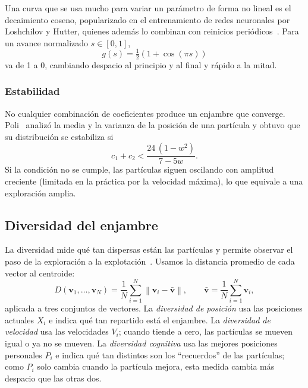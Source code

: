 Una curva que se usa mucho para variar un parámetro de forma no lineal es el decaimiento coseno, popularizado en el entrenamiento de redes neuronales por Loshchilov y Hutter, quienes además lo combinan con reinicios periódicos~\cite{loshchilov2017sgdr}. Para un avance normalizado $s \in [0,1]$,
\begin{equation}
g(s) = \tfrac{1}{2}\left(1 + \cos(\pi s)\right)
\label{eq:coseno}
\end{equation}
va de 1 a 0, cambiando despacio al principio y al final y rápido a la mitad.

\subsubsection{Estabilidad}

No cualquier combinación de coeficientes produce un enjambre que converge. Poli~\cite{poli2009mean} analizó la media y la varianza de la posición de una partícula y obtuvo que su distribución se estabiliza si
\begin{equation}
c_1 + c_2 < \frac{24\,(1 - w^2)}{7 - 5w}.
\label{eq:poli}
\end{equation}
Si la condición no se cumple, las partículas siguen oscilando con amplitud creciente (limitada en la práctica por la velocidad máxima), lo que equivale a una exploración amplia.

\subsection{Diversidad del enjambre}
\label{sec:diversidad}

La diversidad mide qué tan dispersas están las partículas y permite observar el paso de la exploración a la explotación~\cite{olorunda2008measuring}. Usamos la distancia promedio de cada vector al centroide:
\begin{equation}
D(\mathbf{v}_1, \dots, \mathbf{v}_N) = \frac{1}{N} \sum_{i=1}^{N} \left\lVert \mathbf{v}_i - \bar{\mathbf{v}} \right\rVert, \qquad \bar{\mathbf{v}} = \frac{1}{N}\sum_{i=1}^{N} \mathbf{v}_i,
\label{eq:diversidad}
\end{equation}
aplicada a tres conjuntos de vectores. La \textit{diversidad de posición} usa las posiciones actuales $X_i$ e indica qué tan repartido está el enjambre. La \textit{diversidad de velocidad} usa las velocidades $V_i$; cuando tiende a cero, las partículas se mueven igual o ya no se mueven. La \textit{diversidad cognitiva} usa las mejores posiciones personales $P_i$ e indica qué tan distintos son los ``recuerdos'' de las partículas; como $P_i$ solo cambia cuando la partícula mejora, esta medida cambia más despacio que las otras dos.

